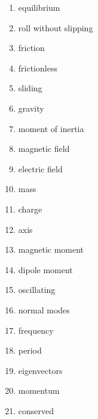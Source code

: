 \documentclass[twocolumn]{article}
\begin{document}
\begin{enumerate}
\item equilibrium
\item roll without slipping
\item friction
\item frictionless
\item sliding
\item gravity
\item moment of inertia
\item magnetic field
\item electric field
\item mass
\item charge
\item axis
\item magnetic moment
\item dipole moment
\item oscillating
\item normal modes
\item frequency
\item period
\item eigenvectors
\item momentum
\item conserved
\end{enumerate}
\end{document}
